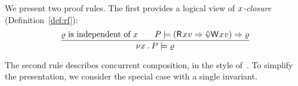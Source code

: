 


We present two proof rules. 
The first provides a logical view of \emph{$x$-closure} (Definition~\ref{def:rf}):
\begin{displaymath}
  \frac{
    \afo \text{ is independent of } \aLoc
    \qquad
    \aPS \models (\DR{\aLoc}{\aVal} \Rightarrow \once \DW{\aLoc}{\aVal}) \Rightarrow \afo
  }{
    \nu \aLoc \DOT \aPS \models \afo
  }
\end{displaymath}

The second rule describes concurrent composition, in the style of~\citet{Abadi:1993:CS:151646.151649}.  To simplify the presentation, we
consider the special case with a single invariant.

